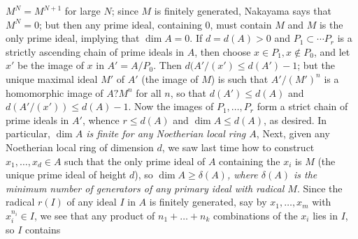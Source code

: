 \documentclass[10pt]{article}
\begin{document}
$M^N = M^{N+1}$ for large $N$; since $M$ is finitely generated, Nakayama
says that $M^N = 0$; but then any prime ideal, containing 0, must
contain $M$ and $M$ is the only prime ideal, implying that $\dim A = 0$.
If $d=d(A)>0$ and $P_1\subset\cdots P_r$ is a strictly ascending chain
of prime ideals in $A$, then choose $x\in P_1,x\notin P_0$, and let $x'$
be the image of $x$ in $A'=A/P_0$. Then $d(A'/(x')\le d(A') -1$; but the
unique maximal ideal $M'$ of $A'$ (the image of $M$) is such that
$A'/(M')^n$ is a homomorphic image of $A?M^n$ for all $n$, so that
$d(A')\le d(A)$ and $d(A'/(x'))\le d(A) - 1$. Now the images of
$P_1,\ldots,P_r$ form a strict chain of prime ideals in $A'$, whence
$r\le d(A)$ and $\dim A\le d(A)$, as desired. In particular, {\sl $\dim
  A$ is finite for any Noetherian local ring $A$}, Next, given any
Noetherian local ring of dimension $d$, we saw last time how to
construct $x_1,\ldots,x_d\in A$ such that the only prime ideal of $A$
containing the $x_i$ is $M$ (the unique prime ideal of height $d$), so
{\sl $\dim A \ge \delta(A)$, where $\delta(A)$ is the minimum number of
  generators of any primary ideal with radical $M$}. Since the radical
$r(I)$ of any ideal $I$ in $A$ is finitely generated, say by
$x_1,\ldots,x_m$ with $x_i^{n_i}\in I$, we see that any product of
$n_1+\ldots+ n_k$ combinations of the $x_i$ lies in $I$, so $I$ contains
\end{document}
